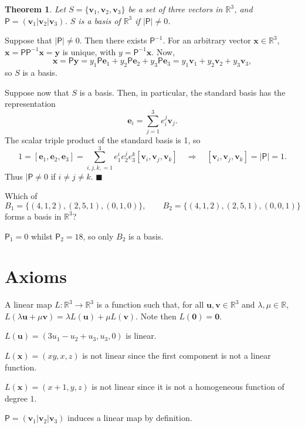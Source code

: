 \documentclass[letter-paper]{tufte-book}
\newtheorem{theorem}{\color{pastel-blue}Theorem}[section]
\newenvironment{proof}[1][Proof]{\begin{trivlist}
\item[\hskip \labelsep {\bfseries #1}]}{\end{trivlist}}
\newenvironment{example}[1][Example]{\begin{trivlist}
\item[\hskip \labelsep {\bfseries #1}]}{\end{trivlist}}
\newcommand{\eb}{\boldsymbol{e}}
\newcommand{\ub}{\boldsymbol{u}}
\newcommand{\vb}{\boldsymbol{v}}
\newcommand{\xb}{\boldsymbol{x}}
\newcommand{\yb}{\boldsymbol{y}}
\newcommand{\qed}{\hfill$\blacksquare$}
\begin{document}
\begin{theorem}
	Let $S=\{\vb_1,\vb_2,\vb_3\}$ be a set of three vectors in $\mathbb{R}^3$,
	and $\mathsf{P}=(\vb_1|\vb_2|\vb_3)$. $S$ is a basis of $\mathbb{R}^3$ if
	$|\mathsf{P}|\neq0$.
\end{theorem}
\begin{proof}
	Suppose that $|\mathsf{P}|\neq0$. Then there exists $\mathsf{P}^{-1}$. For
	an arbitrary vector $\xb\in\mathbb{R}^3$,
	$\xb=\mathsf{P}\mathsf{P}^{-1}\xb=\yb$ is unique, with
	$y=\mathsf{P}^{-1}\xb$. Now,
	\begin{equation*}
		\xb=\mathsf{P}\yb=y_1 \mathsf{P}\eb_1 + y_2 \mathsf{P}\eb_2 +
		y_3 \mathsf{P}\eb_3 = y_1 \vb_1 + y_2 \vb_2 + y_3 \vb_3,
	\end{equation*}
	so $S$ is a basis.
	
	Suppose now that $S$ is a basis. Then, in particular, the standard basis has
	the representation
	\begin{equation*}
		\eb_i = \sum_{j=1}^3 e_i^j \vb_j.
	\end{equation*}
	The scalar triple product of the standard basis is 1, so
	\begin{equation*}
		1=[\eb_1,\eb_2,\eb_3]=\sum_{i,j,k,=1}^3 e_1^i e_2^j e_3^k
		[\vb_i,\vb_j,\vb_k]\quad\Rightarrow\quad
		[\vb_i,\vb_j,\vb_k]=|\mathsf{P}|=1.
	\end{equation*}
	Thus $|\mathsf{P}\neq0$ if $i\neq j\neq k$. \qed
\end{proof}
\begin{example}
	Which of
	\begin{equation*}
		B_1=\{(4,1,2),(2,5,1),(0,1,0)\},\qquad B_2=\{(4,1,2),(2,5,1),(0,0,1)\}
	\end{equation*}
	forms a basis in $\mathbb{R}^3$?
	
	$\mathsf{P}_1=0$ whilst $\mathsf{P}_2=18$, so only $B_2$ is a basis.
\end{example}


\section{Axioms}

A linear map $L:\mathbb{R}^3\rightarrow\mathbb{R}^3$ is a function such that,
for all $\ub,\vb\in\mathbb{R}^3$ and $\lambda,\mu\in\mathbb{R}$,
$L(\lambda\ub+\mu\vb)=\lambda L(\ub)+\mu L(\vb)$. Note then
$L(\boldsymbol{0})=\boldsymbol{0}$.
\begin{example}
	$L(\ub)=(3u_1 -u_2 +u_3, u_3, 0)$ is linear.
	
	$L(\xb)=(xy,x,z)$ is not linear since the first component is not a linear
	function.
	
	$L(\xb)=(x+1,y,z)$ is not linear since it is not a homogeneous function of
	degree $1$.
	
	$\mathsf{P}=(\vb_1 |\vb_2 |\vb_3)$ induces a linear map by definition.
\end{example}
\end{document}
